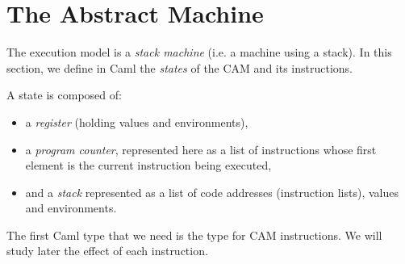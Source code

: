 \section{The Abstract Machine}
%

The execution model is a {\em stack machine} (i.e. a machine using a
stack).  In this section, we define in Caml the {\em states} of the
CAM and its instructions.
%

A state is composed of:
\begin{itemize}
\item a {\em register} (holding values and environments),
\item a {\em program counter}, represented here as a list of instructions
whose first element is the current instruction being executed,
\item and a {\em stack} represented as a list of code addresses (instruction
lists), values and environments.
\end{itemize}
The first Caml type that we need is the type for CAM instructions. We
will study later the effect of each instruction.

